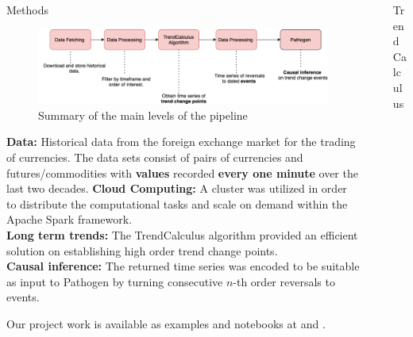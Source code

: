 \documentclass[final]{beamer}
\newlength{\sepwidth}
\newlength{\colwidth}
\newcommand{\separatorcolumn}{\begin{column}{\sepwidth}\end{column}}
\begin{document}
\begin{frame}[fragile]
\begin{columns}[t]
\begin{column}{\colwidth}
    \begin{block}{Methods}
      \vspace{0.6in}
      \begin{figure}
         \centering
         \includegraphics[width=1\textwidth]{Pipeline.png}
         \caption{Summary of the main levels of the pipeline}
         \label{fig:my_label}
      \end{figure}
      \textsf{\textbf{Data:}} Historical data from the foreign exchange market for the trading of currencies. The data sets consist of pairs of currencies and futures/commodities with \textsf{\textbf{values}} recorded \textsf{\textbf{every one minute}} over the last two decades.
      \vspace{0.6in}
      \textsf{\textbf{Cloud Computing:}} A cluster was utilized in order to distribute the computational tasks and scale on demand within the Apache Spark framework.\\
      \vspace{0.6in}
      \textsf{\textbf{Long term trends:}} The TrendCalculus algorithm provided an efficient solution on establishing high order trend change points.\\
      \vspace{0.6in}
      \textsf{\textbf{Causal inference:}} The returned time series was encoded to be suitable as input to Pathogen by turning consecutive  $n$-th order reversals to events.\\
     \end{block}
    \vspace{0.5in}
    
     \begin{alertblock}{}
      Our project work is available as examples and notebooks at \cite{TrendCalculusNotebooks} and \cite{PathogenNotebooks}.  
     \end{alertblock}

\end{column}

\separatorcolumn



\begin{column}{\colwidth}
    \begin{block}{TrendCalculus}
        

\end{block}
\end{column}
\end{columns}
\end{frame}
\end{document}
